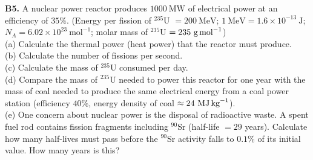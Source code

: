\begin{exercisebox}[28]
\textbf{B5.} A nuclear power reactor produces
$1000\ \text{MW}$ of electrical power at an
efficiency of $35\%$.
(Energy per fission of ${}^{235}$U $= 200\ \text{MeV}$;
$1\ \text{MeV} = 1.6\times10^{-13}\ \text{J}$;
$N_A = 6.02\times10^{23}\ \text{mol}^{-1}$;
molar mass of ${}^{235}$U $= 235\ \text{g\,mol}^{-1}$)\\[4pt]
(a) Calculate the thermal power (heat power) that
the reactor must produce.\\
(b) Calculate the number of fissions per second.\\
(c) Calculate the mass of ${}^{235}$U consumed per
day.\\
(d) Compare the mass of ${}^{235}$U needed to power
this reactor for one year with the mass of coal
needed to produce the same electrical energy from
a coal power station (efficiency $40\%$, energy
density of coal $\approx 24\ \text{MJ\,kg}^{-1}$).\\
(e) One concern about nuclear power is the
disposal of radioactive waste. A spent fuel rod
contains fission fragments including ${}^{90}$Sr
(half-life $= 29$ years). Calculate how many
half-lives must pass before the ${}^{90}$Sr
activity falls to $0.1\%$ of its initial value.
How many years is this?
\hfill{}

\end{exercisebox}
